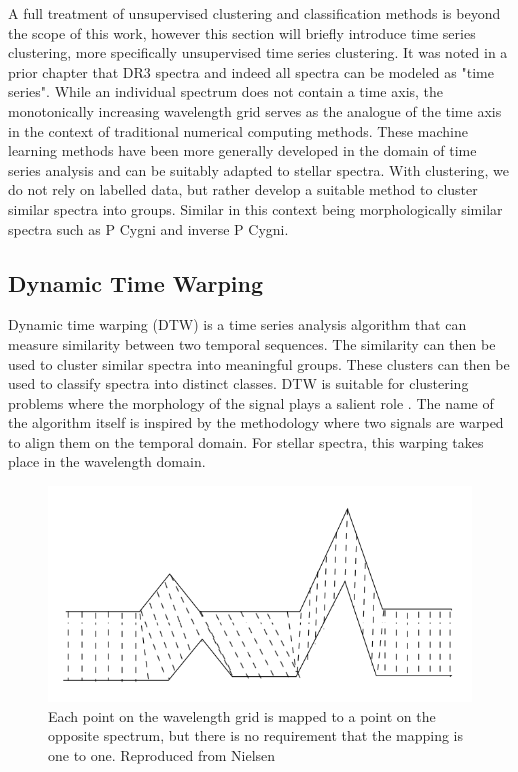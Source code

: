 A full treatment of unsupervised clustering and classification methods is beyond the scope of this work, however this section will briefly introduce time series clustering, more specifically unsupervised time series clustering. It was noted in a prior chapter that DR3 spectra and indeed all spectra can be modeled as "time series". While an individual spectrum does not contain a time axis, the monotonically increasing wavelength grid serves as the analogue of the time axis in the context of traditional numerical computing methods. These machine learning methods have been more generally developed in the domain of time series analysis \cite{nielsen2019practical} and can be suitably adapted to stellar spectra. With clustering, we do not rely on labelled data, but rather develop a suitable method to cluster similar spectra into groups. Similar in this context being morphologically similar spectra such as P Cygni and inverse P Cygni.

\subsection{Dynamic Time Warping}

Dynamic time warping (DTW) is a time series analysis algorithm that can measure similarity between two temporal sequences. The similarity can then be used to cluster similar spectra into meaningful groups. These clusters can then be used to classify spectra into distinct classes. DTW is suitable for clustering problems where the morphology of the signal plays a salient role \cite{nielsen2019practical}. The name of the algorithm itself is inspired by the methodology where two signals are warped to align them on the temporal domain. For stellar spectra, this warping takes place in the wavelength domain. 

\begin{figure}[h]
\centering
\includegraphics[scale=0.90]{figures/Dynamic_time_warping.png}
\caption{Each point on the wavelength grid is mapped to a point on the opposite spectrum, but there is no requirement that the mapping is one to one. Reproduced from Nielsen \cite{nielsen2019practical}}
\end{figure}


